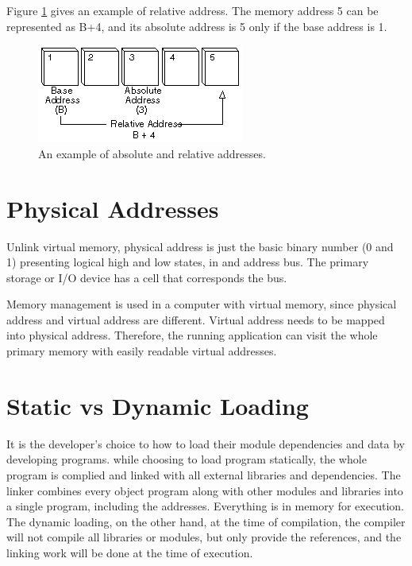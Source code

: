 \documentclass[doc,natbib,12pt]{apa6}
\begin{document}
	Figure \ref{fig:relativeAddress} gives an example of relative address. The memory address 5 can be represented as B+4, and its absolute address is 5 only if the base address is 1.
	
	\begin{figure}[h]
		\centering
		\includegraphics{relative-address.png}
		\caption{\label{fig:relativeAddress}An example of absolute and relative addresses. \citep{Beal2018}}
	\end{figure}
	
	\newpage
	\section{Physical Addresses} \label{chp:physicalAddress}
	Unlink virtual memory, physical address is just  the basic binary number (0 and 1) presenting logical high and low states, in and address bus. The primary storage or I/O device has a cell that corresponds the bus.
	
	Memory management is used in a computer with virtual memory, since physical address and virtual address are different. Virtual address needs to be mapped into physical address. Therefore, the running application can visit the whole primary memory with easily readable virtual addresses.
	
	\newpage
	\section{Static vs Dynamic Loading} \label{chp:staticDynamicLoading}
	It is the developer's choice to how to load their module dependencies and data by developing programs. while choosing to load program statically, the whole program is complied and linked with all external libraries and dependencies. The linker combines every object program along with other modules and libraries into a single program, including the addresses. Everything is in memory for execution. The dynamic loading, on the other hand, at the time of compilation, the compiler will not compile all libraries or modules, but only provide the references, and the linking work will be done at the time of execution. 
	
\end{document}
